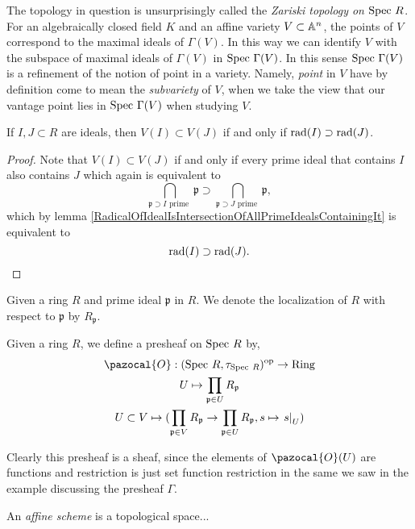 \begin{remark}
    The topology in question is unsurprisingly called the \emph{Zariski topology on $\mathrm{Spec} \ R$}. For an algebraically closed field $K$ and an affine variety $V\subset \mathbb{A}^n$, the points of $V$ correspond to the maximal ideals of $\Gamma(V)$. In this way we can identify $V$ with the subspace of maximal ideals of $\Gamma(V)$ in $\mathrm{Spec} \ \Gamma(V)$. In this sense $\mathrm{Spec} \ \Gamma(V)$ is a refinement of the notion of point in a variety. Namely, \emph{point} in $V$ have by definition come to mean the \emph{subvariety} of $V$, when we take the view that our vantage point lies in $\mathrm{Spec}\ \Gamma(V)$ when studying $V$.
\end{remark}
\begin{lemma}
    If $I,J\subset R$ are ideals, then $V(I)\subset V(J)$ if and only if $\mathrm{rad}(I)\supset \mathrm{rad}(J)$.
\end{lemma}
\begin{proof}
    Note that $V(I)\subset V(J)$ if and only if every prime ideal that contains $I$ also contains $J$ which again is equivalent to 
    $$
        \bigcap_{\mathfrak{p}\supset I \text{ prime }} \mathfrak{p} \supset \bigcap_{\mathfrak{p}\supset J \text{ prime }} \mathfrak{p}, 
    $$
    which by lemma \ref{RadicalOfIdealIsIntersectionOfAllPrimeIdealsContainingIt} is equivalent to 
    $$
        \mathrm{rad}(I)\supset \mathrm{rad}(J).
    $$
\end{proof}
Given a ring $R$ and prime ideal $\mathfrak{p}$ in $R$. We denote the localization of $R$ with respect to $\mathfrak{p}$ by $R_\mathfrak{p}$.
\begin{definition}
    Given a ring $R$, we define a presheaf on $\mathrm{Spec} \ R$ by, 
    \begin{gather*}
        \pazocal{O}:(\Spec\ R, \tau_{\Spec\ R})\op\rightarrow \mathrm{Ring}\\
        U \mapsto \prod_{\mathfrak{p}\in U} R_\mathfrak{p}\\
        U\subset V \mapsto (\prod_{\mathfrak{p}\in V} R_\mathfrak{p}\rightarrow \prod_{\mathfrak{p}\in U} R_\mathfrak{p}, s\mapsto \left. s\right|_U) 
    \end{gather*}
\end{definition}
\begin{remark}
    Clearly this presheaf is a sheaf, since the elements of $\pazocal{O}(U)$ are functions and restriction is just set function restriction in the same we saw in the example discussing the presheaf $\Gamma$. 
\end{remark}
\begin{definition}
    An \emph{affine scheme} is a topological space...
\end{definition}

